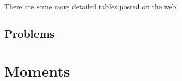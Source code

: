 \documentclass[12pt]{extbook}
\begin{document}
There are some more detailed tables posted on the web.

\section{Problems}

%
%
%
%
%
%
%
%

\chapter{Moments}
\end{document}
